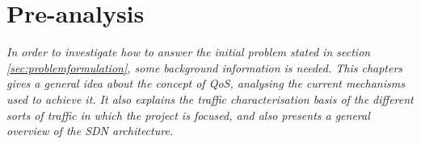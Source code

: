 \chapter{Pre-analysis}
\label{sec:preanalysis}

\textit{In order to investigate how to answer the initial problem stated in section \ref{sec:problemformulation}, some background information is needed. This chapters gives a general idea about the concept of QoS, analysing the current mechanisms used to achieve it. It also explains the traffic characterisation basis of the different sorts of traffic in which the project is focused, and also presents a general overview of the SDN architecture.}






%
%
% 

